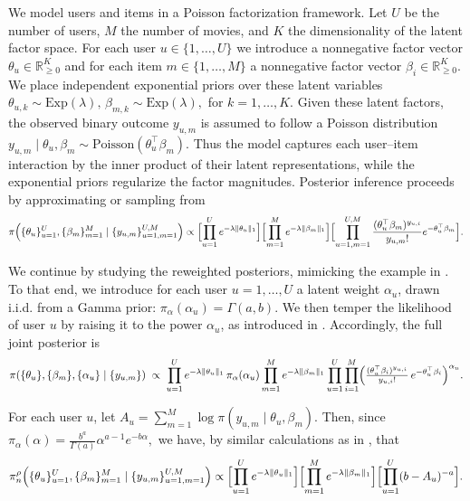 \documentclass[11pt, oneside]{amsart}
\theoremstyle{definition}   %
\newcommand{\R}{\mathbb{R}}
\newcommand{\loss}{\rho}
\newcommand{\mposterior}{\pi_n^{\loss}}
\begin{document}
%
We model users and items in a Poisson factorization framework.
Let $U$ be the number of users, $M$ the number of movies, and $K$ the dimensionality of the latent factor space.
For each user $u\in\{1,\dots,U\}$ we introduce a nonnegative factor vector $\theta_u\in\R^K_{\geq 0}$ and for each item $m\in\{1,\dots,M\}$ a nonnegative factor vector $\beta_i\in\R^K_{\geq 0}$.
We place independent exponential priors over these latent variables
%
\(
    \theta_{u,k} \sim \textrm {Exp}(\lambda), 
    \,
    \beta_{m,k} \sim \textrm {Exp}(\lambda),
\)
%
for $k=1,\dots,K$.
%
Given these latent factors, the observed binary outcome $y_{u,m}$ is assumed to follow a Poisson distribution
%
$y_{u,m} \mid \theta_u, \beta_m \sim \textrm{Poisson}(\theta_u^\top\beta_m).$
%
Thus the model captures each user–item interaction by the inner product of their latent representations, while the exponential priors regularize the factor magnitudes.
Posterior inference proceeds by approximating or sampling from
\[
    \pi \Bigl (\{\theta_u\}_{u = 1}^U,\{\beta_m\}_{m=1}^M \mid \{y_{u, m}\}_{u=1, m=1}^{U, M} \Bigr) \propto
    \Bigl[\prod_{u = 1}^U e^{-\lambda \| \theta_{u} \|_1}\Bigr]
    \Bigl[\prod_{m = 1}^M e^{-\lambda \| \beta_{m} \|_1}\Bigr]
    \Bigl[\prod_{u = 1, m = 1}^{U, M} \frac{(\theta_u^\top \beta_m )^{y_{u,i}}}{y_{u,m}!}e^{-\theta_u^\top \beta_m }\Bigr].
\]

%
We continue by studying the reweighted posteriors, mimicking the example in \cite[Section 4]{wang:kucukelbir:blei2017}.
%
To that end, we introduce for each user \(u=1,\dots,U\) a latent weight \(\alpha_{u}\), drawn i.i.d. from a Gamma prior:
%
\(
    \pi_\alpha(\alpha_{u} ) = \Gamma(a, b).
\)
%
We then temper the likelihood of user \(u\) by raising it to the power \(\alpha_{u}\), as introduced in .  
%
Accordingly, the full joint posterior is
\[
\pi(\{\theta_u\},\{\beta_m\},\{\alpha_u\}\mid \{y_{u,m}\})
\;\propto\;
\prod_{u=1}^U e^{-\lambda\|\theta_u\|_1}\,\pi_\alpha(\alpha_u)
\prod_{m=1}^M e^{-\lambda\|\beta_m\|_1}
\prod_{u=1}^U\prod_{i=1}^M 
   \Bigl(\tfrac{(\theta_u^\top\beta_i)^{y_{u,i}}}{y_{u,i}!}\,
   e^{-\theta_u^\top \beta_i}\Bigr)^{\alpha_u}.
\]

For each user \(u\), let
%
\(
    A_u = \sum_{m=1}^M \log \pi (y_{u,m}\mid \theta_u,\beta_m).
\)
%
Then, since
%
\(
    \pi_\alpha(\alpha)
    =\tfrac{b^a}{\Gamma(a)}\alpha^{a-1} e^{-b\alpha},
\)
%
we have, by similar calculations as in , that
%
\begin{equation}
\label{eqn::poisson-factorization-form-of-m-posterior}
    \mposterior\Bigl (\{\theta_u\}_{u = 1}^U,\{\beta_m\}_{m=1}^M \mid \{y_{u, m}\}_{u=1, m=1}^{U, M} \Bigr) \propto
    \Bigl[\prod_{u = 1}^U e^{-\lambda \| \theta_{u} \|_1}\Bigr]
    \Bigl[\prod_{m = 1}^M e^{-\lambda \| \beta_{m} \|_1}\Bigr]
    \Bigl[ \prod_{u=1}^U (b - A_u)^{-a} \Bigr].
\end{equation}
%
\end{document}

